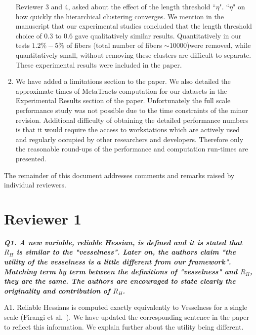 \documentclass[]{article}
\begin{document}
\begin{enumerate}
{			Reviewer 3 and  4, asked  about the effect of the length threshold ``$\eta$".  ``$\eta$" on how quickly the hierarchical clustering converges. We mention in the manuscript that our experimental studies concluded that the length threshold choice of 0.3 to 0.6 gave qualitatively similar results. Quantitatively in our  tests $1.2\% - 5\%$ of fibers (total number of fibers $\sim$10000)were removed, while quantitatively small, without removing these clusters are difficult to separate. These experimental results were included in the paper.
			}
			\item{
				We have added a limitations section to the paper. We also detailed the approximate times of MetaTracts computation for our datasets in the Experimental Results section of the paper. Unfortunately the full scale performance study was not possible due to the time constraints of the minor revision. Additional difficulty of obtaining the detailed performance numbers is that it would require the access to workstations which are actively used and regularly occupied by other researchers and developers. Therefore only the reasonable round-ups of the performance and computation run-times are presented.
				}
\end{enumerate}
   
 The remainder of this document addresses comments and remarks raised by individual reviewers.

\section*{Reviewer 1}

\textbf{\textit{
Q1. A new variable, reliable Hessian, is defined and it is stated that $R_{H}$ is similar to the "vesselness".  Later on, the authors claim "the utility of the vesselness is a little different from our framework". Matching term by term between the definitions of "vesselness" and $R_{H}$, they are the same. The authors are encouraged to state clearly the originality and contribution of $R_{H}$.
}}


A1. Reliable Hessians is computed exactly equivalently to Vesselness for a single scale (Firangi et al.~\cite{Frangi1998}). We have  updated the corresponding sentence in the paper to reflect this information. We explain further about the utility being different.
\end{document}
